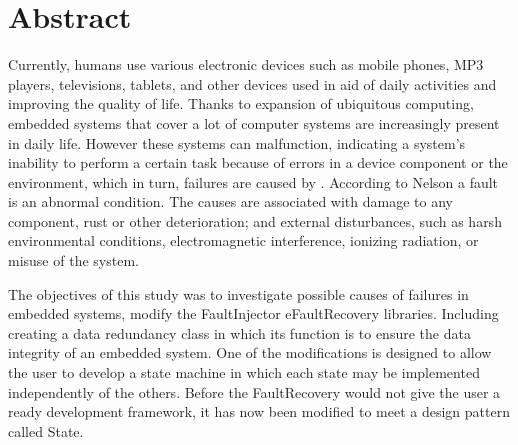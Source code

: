 
\chapter*{Abstract}

Currently, humans use various electronic devices such as mobile phones, MP3 players, televisions, tablets, and other devices used in aid of daily activities and improving the quality of life. Thanks to expansion of ubiquitous computing, embedded systems that cover a lot of computer systems are increasingly present in daily life. However these systems can malfunction, indicating a system's inability to perform a certain task because of errors in a device component or the environment, which in turn, failures are caused by \cite{Nelson:1990}. According to Nelson \cite{Nelson:1990} a fault is an abnormal condition. The causes are associated with damage to any component, rust or other deterioration; and external disturbances, such as harsh environmental conditions, electromagnetic interference, ionizing radiation, or misuse of the system.

The objectives of this study was to investigate possible causes of failures in embedded systems, modify the FaultInjector eFaultRecovery libraries. Including creating a data redundancy class in which its function is to ensure the data integrity of an embedded system. One of the modifications is designed to allow the user to develop a state machine in which each state may be implemented independently of the others. Before the FaultRecovery would not give the user a ready development framework, it has now been modified to meet a design pattern called State.

